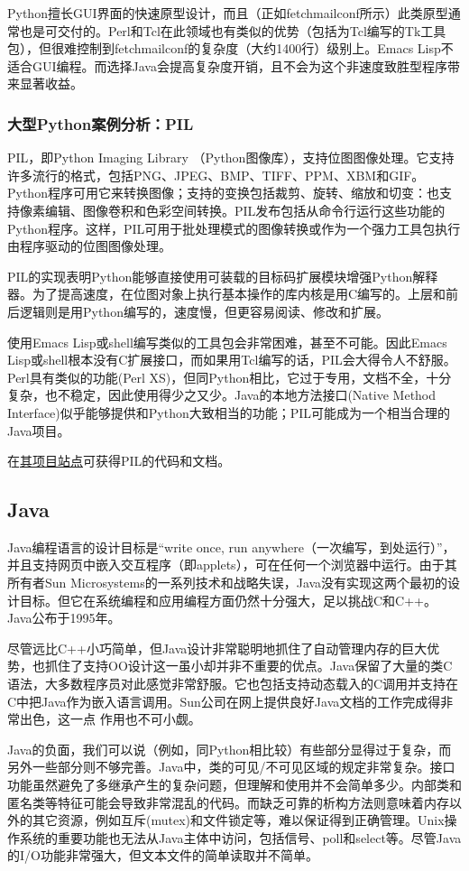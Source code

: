 \documentclass[12pt,oneside]{book}
\begin{document}
Python擅长GUI界面的快速原型设计，而且（正如fetchmailconf所示）此类原型通常也是可交付的。Perl和Tcl在此领域也有类似的优势（包括为Tcl编写的Tk工具包），但很难控制到fetchmailconf的复杂度（大约1400行）级别上。Emacs Lisp不适合GUI编程。而选择Java会提高复杂度开销，且不会为这个非速度致胜型程序带来显著收益。

\subsubsection{大型Python案例分析：PIL}
PIL，即Python Imaging Library （Python图像库），支持位图图像处理。它支持许多流行的格式，包括PNG、JPEG、BMP、TIFF、PPM、XBM和GIF。Python程序可用它来转换图像；支持的变换包括裁剪、旋转、缩放和切变：也支持像素编辑、图像卷积和色彩空间转换。PIL发布包括从命令行运行这些功能的Python程序。这样，PIL可用于批处理模式的图像转换或作为一个强力工具包执行由程序驱动的位图图像处理。

PIL的实现表明Python能够直接使用可装载的目标码扩展模块增强Python解释器。为了提高速度，在位图对象上执行基本操作的库内核是用C编写的。上层和前后逻辑则是用Python编写的，速度慢，但更容易阅读、修改和扩展。

使用Emacs Lisp或shell编写类似的工具包会非常困难，甚至不可能。因此Emacs Lisp或shell根本没有C扩展接口，而如果用Tcl编写的话，PIL会大得令人不舒服。Perl具有类似的功能(Perl XS)，但同Python相比，它过于专用，文档不全，十分复杂，也不稳定，因此使用得少之又少。Java的本地方法接口(Native Method Interface)似乎能够提供和Python大致相当的功能；PIL可能成为一个相当合理的Java项目。

在\href{http://www.pythonware.com/products/pil/}{其项目站点}可获得PIL的代码和文档。

\subsection{Java}
Java编程语言的设计目标是“write once, run anywhere（一次编写，到处运行）”，并且支持网页中嵌入交互程序（即applets），可在任何一个浏览器中运行。由于其所有者Sun Microsystems的一系列技术和战略失误，Java没有实现这两个最初的设计目标。但它在系统编程和应用编程方面仍然十分强大，足以挑战C和C++。 Java公布于1995年。

尽管远比C++小巧简单，但Java设计非常聪明地抓住了自动管理内存的巨大优势，也抓住了支持OO设计这一虽小却并非不重要的优点。Java保留了大量的类C语法，大多数程序员对此感觉非常舒服。它也包括支持动态载入的C调用并支持在C中把Java作为嵌入语言调用。Sun公司在网上提供良好Java文档的工作完成得非常出色，这一点
作用也不可小觑。

Java的负面，我们可以说（例如，同Python相比较）有些部分显得过于复杂，而另外一些部分则不够完善。Java中，类的可见/不可见区域的规定非常复杂。接口功能虽然避免了多继承产生的复杂问题，但理解和使用并不会简单多少。内部类和匿名类等特征可能会导致非常混乱的代码。而缺乏可靠的析构方法则意味着内存以外的其它资源，例如互斥(mutex)和文件锁定等，难以保证得到正确管理。Unix操作系统的重要功能也无法从Java主体中访问，包括信号、poll和select等。尽管Java的I/O功能非常强大，但文本文件的简单读取并不简单。
\end{document}
